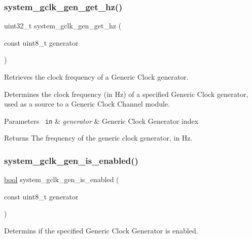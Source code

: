 \subsubsection{\texorpdfstring{system\_gclk\_gen\_get\_hz()}{system\_gclk\_gen\_get\_hz()}}
{\footnotesize\ttfamily uint32\+\_\+t system\+\_\+gclk\+\_\+gen\+\_\+get\+\_\+hz (\begin{DoxyParamCaption}\item[{const uint8\+\_\+t}]{generator }\end{DoxyParamCaption})}



Retrieves the clock frequency of a Generic Clock generator. 

Determines the clock frequency (in Hz) of a specified Generic Clock generator, used as a source to a Generic Clock Channel module.


\begin{DoxyParams}[1]{Parameters}
\mbox{\texttt{ in}}  & {\em generator} & Generic Clock Generator index\\
\hline
\end{DoxyParams}
\begin{DoxyReturn}{Returns}
The frequency of the generic clock generator, in Hz. 
\end{DoxyReturn}
\mbox{\label{group__asfdoc__sam0__system__clock__group_ga113af9a430f74e082401383109e4eefd}} 
\subsubsection{\texorpdfstring{system\_gclk\_gen\_is\_enabled()}{system\_gclk\_gen\_is\_enabled()}}
{\footnotesize\ttfamily \mbox{\hyperlink{group__group__sam0__utils_ga97a80ca1602ebf2303258971a2c938e2}{bool}} system\+\_\+gclk\+\_\+gen\+\_\+is\+\_\+enabled (\begin{DoxyParamCaption}\item[{const uint8\+\_\+t}]{generator }\end{DoxyParamCaption})}



Determins if the specified Generic Clock Generator is enabled. 


